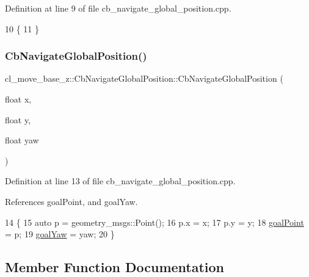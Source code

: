 Definition at line 9 of file cb\+\_\+navigate\+\_\+global\+\_\+position.\+cpp.


\begin{DoxyCode}
10 \{
11 \}
\end{DoxyCode}
\mbox{\label{classcl__move__base__z_1_1CbNavigateGlobalPosition_a79d42c0eeee48af5e73d917fa2d5b4f5}} 
\subsubsection{\texorpdfstring{Cb\+Navigate\+Global\+Position()}{CbNavigateGlobalPosition()}\hspace{0.1cm}{\footnotesize\ttfamily [2/2]}}
{\footnotesize\ttfamily cl\+\_\+move\+\_\+base\+\_\+z\+::\+Cb\+Navigate\+Global\+Position\+::\+Cb\+Navigate\+Global\+Position (\begin{DoxyParamCaption}\item[{float}]{x,  }\item[{float}]{y,  }\item[{float}]{yaw }\end{DoxyParamCaption})}



Definition at line 13 of file cb\+\_\+navigate\+\_\+global\+\_\+position.\+cpp.



References goal\+Point, and goal\+Yaw.


\begin{DoxyCode}
14 \{
15     \textcolor{keyword}{auto} p = geometry\_msgs::Point();
16     p.x = x;
17     p.y = y;
18     \hyperlink{classcl__move__base__z_1_1CbNavigateGlobalPosition_a1960e244a242b2c308fb717617bbbecb}{goalPoint} = p;
19     \hyperlink{classcl__move__base__z_1_1CbNavigateGlobalPosition_a839900de7f664b27c9be189fadbaa003}{goalYaw} = yaw;
20 \}
\end{DoxyCode}


\subsection{Member Function Documentation}
\mbox{\label{classcl__move__base__z_1_1CbNavigateGlobalPosition_a0b8525ea9e4388b27cb1f9b1e06a3b63}} 
